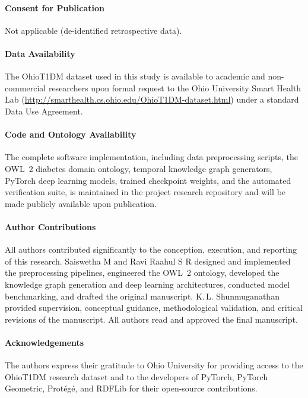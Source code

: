 \documentclass[10pt,a4paper]{article}
\begin{document}
\paragraph{Consent for Publication}
Not applicable (de-identified retrospective data).

\paragraph{Data Availability}
The OhioT1DM dataset used in this study is available to academic and non-commercial researchers upon formal request to the Ohio University Smart Health Lab (\url{http://smarthealth.cs.ohio.edu/OhioT1DM-dataset.html}) under a standard Data Use Agreement.

\paragraph{Code and Ontology Availability}
The complete software implementation, including data preprocessing scripts, the OWL~2 diabetes domain ontology, temporal knowledge graph generators, PyTorch deep learning models, trained checkpoint weights, and the automated verification suite, is maintained in the project research repository and will be made publicly available upon publication.

\paragraph{Author Contributions}
All authors contributed significantly to the conception, execution, and reporting of this research. Saiswetha M and Ravi Raahul S R designed and implemented the preprocessing pipelines, engineered the OWL~2 ontology, developed the knowledge graph generation and deep learning architectures, conducted model benchmarking, and drafted the original manuscript. K.\,L. Shunmuganathan provided supervision, conceptual guidance, methodological validation, and critical revisions of the manuscript. All authors read and approved the final manuscript.

\paragraph{Acknowledgements}
The authors express their gratitude to Ohio University for providing access to the OhioT1DM research dataset and to the developers of PyTorch, PyTorch Geometric, Prot\'eg\'e, and RDFLib for their open-source contributions.
\end{document}
